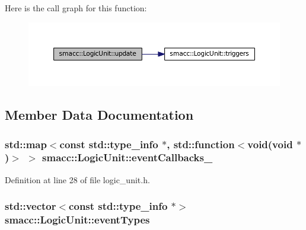 Here is the call graph for this function\+:
\nopagebreak
\begin{figure}[H]
\begin{center}
\leavevmode
\includegraphics[width=350pt]{classsmacc_1_1LogicUnit_afcec0608a17e039791403472a2411539_cgraph}
\end{center}
\end{figure}




\subsection{Member Data Documentation}
\subsubsection[{\texorpdfstring{event\+Callbacks\+\_\+}{eventCallbacks_}}]{\setlength{\rightskip}{0pt plus 5cm}std\+::map$<$const std\+::type\+\_\+info $\ast$, std\+::function$<$void(void $\ast$)$>$ $>$ smacc\+::\+Logic\+Unit\+::event\+Callbacks\+\_\+}\hypertarget{classsmacc_1_1LogicUnit_a29196899a02ed436e9ba68784b4d5cf4}{}\label{classsmacc_1_1LogicUnit_a29196899a02ed436e9ba68784b4d5cf4}


Definition at line 28 of file logic\+\_\+unit.\+h.

\subsubsection[{\texorpdfstring{event\+Types}{eventTypes}}]{\setlength{\rightskip}{0pt plus 5cm}std\+::vector$<$const std\+::type\+\_\+info $\ast$$>$ smacc\+::\+Logic\+Unit\+::event\+Types}\hypertarget{classsmacc_1_1LogicUnit_a6f02a49da9b408b54a2755c18c5616a8}{}\label{classsmacc_1_1LogicUnit_a6f02a49da9b408b54a2755c18c5616a8}


